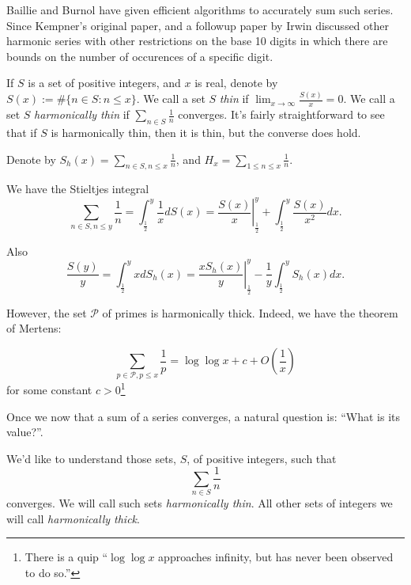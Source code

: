 \documentclass{article}
\begin{document}
Baillie \cite{baillie1979sums} and Burnol \cite{burnol2024moments}
have given efficient algorithms to accurately sum such series.
Since Kempner's original paper, and a followup paper by Irwin 
\cite{irwin1916curious} discussed other harmonic series with other
restrictions on the base 10 digits in which there are bounds on the
number of occurences of a specific digit.

If $S$ is a set of positive integers, and $x$ is real, denote by $S(x)
:= \#\{n \in S: n \le x\}$. We call a set $S$ \emph{thin} if
$\lim_{x \rightarrow \infty} \frac{S(x)}{x} = 0$. We call a set $S$
\emph{harmonically thin} if $\sum_{n \in S} \frac{1}{n}$ converges.
It's fairly straightforward to see that if $S$ is harmonically thin,
then it is thin, but the converse does hold.

Denote by $S_h(x) = \sum_{n \in S, n \le x}\frac{1}{n}$, and $H_x =
\sum_{1 \le n \le x} \frac{1}{n}$.

We have the Stieltjes integral
\begin{displaymath}
  \sum_{n \in S, n \le y} \frac{1}{n} = \int_{\frac{1}{2}}^y \frac{1}{x} d S(x) =
\left.\frac{S(x)}{x} \right|_{\frac{1}{2}}^y + \int_{\frac{1}{2}}^y \frac{S(x)}{x^2} dx.
\end{displaymath}

Also
\begin{displaymath}
  \frac{S(y)}{y} = \int_{\frac{1}{2}}^y x d S_h(x) = \left. \frac{x S_h(x)}{y}
  \right|_{\frac{1}{2}}^y - \frac{1}{y} \int_{\frac{1}{2}}^y S_h(x) dx.
\end{displaymath}

However, the set $\mathcal{P}$ of primes is harmonically
thick. Indeed, we have the theorem of Mertens:

\begin{equation}
\label{eq:mertens}
\sum_{p \in \mathcal{P}, p \le x} \frac{1}{p} = \log \log x + c +
O\left(\frac{1}{x}\right)
\end{equation}
for some constant $c > 0$\footnote{There is a quip ``$\log \log x$
  approaches infinity, but has never been observed to do so.''}

Once we now that a sum of a series converges, a natural question is:
``What is its value?''.

We'd like to understand those sets, $S$, of positive integers, such
that
\begin{equation}
  \label{eq:thin}
  \sum_{n \in S} \frac{1}{n}
\end{equation}
converges. We will call such sets \emph{harmonically thin}. All other
sets of integers we will call \emph{harmonically thick}. 
\end{document}
